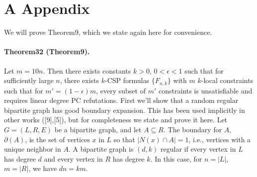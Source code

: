 \documentclass[10pt,a4paper]{article}
\begin{document}
\section*{A Appendix}
We will prove Theorem9, which we state again here for convenience.
\paragraph{Theorem32 (Theorem9).} Let $m=10n$. Then there exists constants $k>0$, $0<\epsilon<1$ such that for sufficiently large $n$, there exists $k$-CSP formulas $\{F_{n,k}\}$ with $m$ $k$-local constraints such that for $m'=(1-\epsilon)m$, every subset of $m'$ constraints is unsatisfiable and requires linear degree PC refutations.
First we'll show that a random regular bipartite graph has good boundary expansion. This has been used implicitly in other works ([9],[5]), but for completeness we state and prove it here. Let $G=(L,R,E)$ be a bipartite graph, and let $A\subseteq R$. The boundary for $A$, $\partial(A)$, is the set of vertices $x$ in $L$ so that $|N(x)\cap A|=1$, i.e., vertices with a unique neighbor in $A$. A bipartite graph is $(d,k)$ regular if every vertex in $L$ has degree $d$ and every vertex in $R$ has degree $k$. In this case, for $n=|L|$, $m=|R|$, we have $dn=km$.
\end{document}
